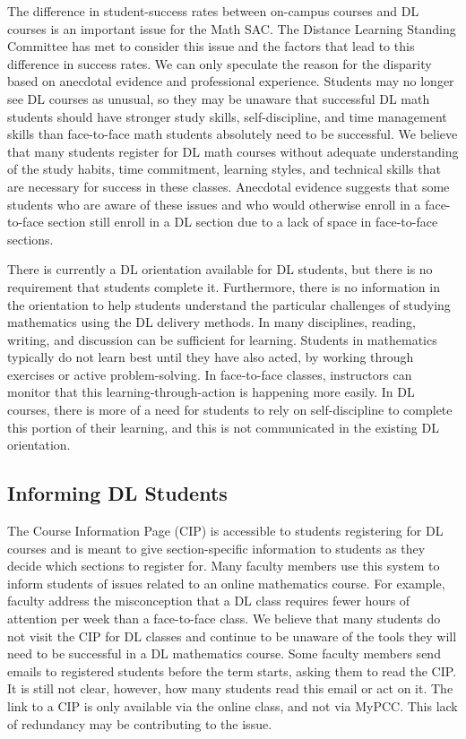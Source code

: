 \begin{figure}[!htb]
\begin{minipage}{.3\textwidth}
    \end{minipage}
\end{figure}

The difference in student-success rates between on-campus courses and DL courses is an important issue for the Math SAC.  The Distance Learning Standing Committee has met to consider this issue and the factors that lead to this difference in success rates.  We can only speculate the reason for the disparity based on anecdotal evidence and professional experience.  Students may no longer see DL courses as unusual, so they may be unaware that successful DL math students should have stronger study skills, self-discipline, and time management skills than face-to-face math students absolutely need to be successful. We believe that many students register for DL math courses without adequate understanding of the study habits, time commitment, learning styles, and technical skills that are necessary for success in these classes. Anecdotal evidence suggests that some students who are aware of these issues and who would otherwise enroll in a face-to-face section still enroll in a DL section due to a lack of space in face-to-face sections.

There is currently a DL orientation available for DL students, but there is no requirement that students complete it. Furthermore, there is no information in the orientation to help students understand the particular challenges of studying mathematics using the DL delivery methods.  In many disciplines, reading, writing, and discussion can be sufficient for learning. Students in mathematics typically do not learn best until they have also acted, by working through exercises or active problem-solving. In face-to-face classes, instructors can monitor that this learning-through-action is happening more easily. In DL courses, there is more of a need for students to rely on self-discipline to complete this portion of their learning, and this is not communicated in the existing DL orientation.


\subsection{Informing DL Students}
The Course Information Page (CIP) is accessible to students registering for DL courses and is meant to give section-specific information to students as they decide which sections to register for.   Many faculty members use this system to inform students of issues related to an online mathematics course.  For example, faculty address the misconception that a DL class requires fewer hours of attention per week than a face-to-face class. We believe that many students do not visit the CIP for DL classes and continue to be unaware of the tools they will need to be successful in a DL mathematics course.   Some faculty members send emails to registered students before the term starts, asking them to read the CIP.  It is still not clear, however, how many students read this email or act on it.  The link to a CIP is only available via the online class, and not via MyPCC. This lack of redundancy may be contributing to the issue.

